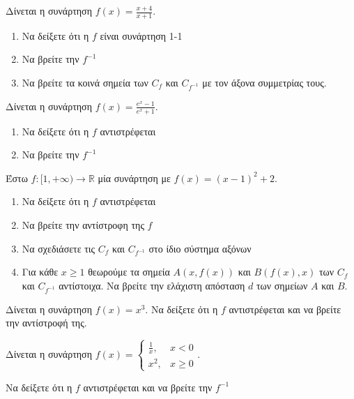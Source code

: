 \documentclass{presentation}
\begin{document}
\begin{askisi}
  Δίνεται η συνάρτηση $f(x)=\frac{x+4}{x+1}$.
  \begin{enumerate}
    \item Να δείξετε ότι η $f$ είναι συνάρτηση 1-1 \pause
    \item Να βρείτε την $f^{-1}$
    \item Να βρείτε τα κοινά σημεία των $C_f$ και $C_{f^{-1}}$ με τον άξονα συμμετρίας τους.
  \end{enumerate}
\end{askisi}

\begin{askisi}
  Δίνεται η συνάρτηση $f(x)=\frac{e^x-1}{e^x+1}$.
  \begin{enumerate}
    \item Να δείξετε ότι η $f$ αντιστρέφεται\pause
    \item Να βρείτε την $f^{-1}$
  \end{enumerate}
\end{askisi}

\begin{askisi}
  Έστω $f:[1,+\infty)\to \mathbb{R}$ μία συνάρτηση με $f(x)=(x-1)^2+2$.
  \begin{enumerate}
    \item Να δείξετε ότι η $f$ αντιστρέφεται \pause
    \item Να βρείτε την αντίστροφη της $f$ \pause
    \item Να σχεδιάσετε τις $C_f$ και $C_{f^{-1}}$ στο ίδιο σύστημα αξόνων\pause
    \item Για κάθε $x\ge 1$ θεωρούμε τα σημεία $Α(x,f(x))$ και $Β(f(x),x)$ των $C_f$ και $C_{f^{-1}}$ αντίστοιχα. Να βρείτε την ελάχιστη απόσταση $d$ των σημείων $Α$ και $Β$.
  \end{enumerate}
\end{askisi}

\begin{askisi}
  Δίνεται η συνάρτηση $f(x)=x^3$. Να δείξετε ότι η $f$ αντιστρέφεται και να βρείτε την αντίστροφή της.
\end{askisi}

\begin{askisi}
  Δίνεται η συνάρτηση $f(x)=\begin{cases}
      \frac{1}{x}, & x<0    \\
      x^2,         & x\ge 0
    \end{cases}$.

  Να δείξετε ότι η $f$ αντιστρέφεται και να βρείτε την $f^{-1}$
\end{askisi}
\end{document}
